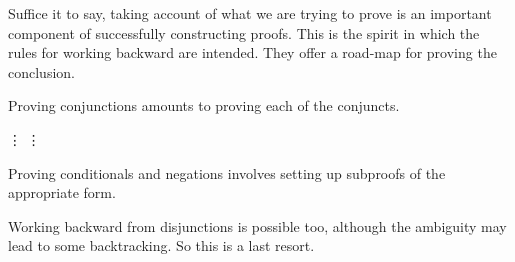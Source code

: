 Suffice it to say, taking account of what we are trying to prove is an important
component of successfully constructing proofs. This is the spirit in which the
rules for working backward are intended. They offer a road-map for proving the
conclusion.

Proving conjunctions amounts to proving each of the conjuncts.

\begin{fitchrule}
  \label{def:proving-conjunctions}
  \leavevmode
  \vspace{-0.9\baselineskip}
  \begin{fitchproof}
     {\vdots}    
     {\ephi}
     {\vdots}    
     {\epsi}   
     {\ephi\eand\epsi} 
  \end{fitchproof}
\end{fitchrule}

Proving conditionals and negations involves setting up subproofs of the
appropriate form.


Working backward from disjunctions is possible too, although the ambiguity
may lead to some backtracking. So this is a last resort.


